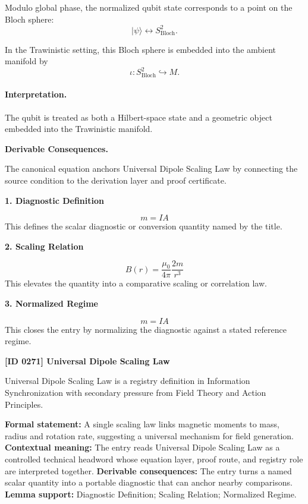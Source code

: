Modulo global phase, the normalized qubit state corresponds to a point on the Bloch sphere:
\begin{equation}
|\psi\rangle \longleftrightarrow S^2_{\mathrm{Bloch}} .
\end{equation}

In the Trawinistic setting, this Bloch sphere is embedded into the ambient manifold by
\begin{equation}
\boxed{
\iota:S^2_{\mathrm{Bloch}}\hookrightarrow M .
}
\end{equation}

\paragraph{Interpretation.}
The qubit is treated as both a Hilbert-space state and a geometric object embedded into the Trawinistic manifold.

\par\vspace{0.35em}
\noindent\textbf{Derivable Consequences.}\quad
\begingroup
\footnotesize
\raggedright
The canonical equation anchors Universal Dipole Scaling Law by connecting the source condition to the derivation layer and proof certificate.
\par\endgroup

\noindent\textbf{1. Diagnostic Definition}\par
\[
m=IA
\]
\noindent This defines the scalar diagnostic or conversion quantity named by the title.\par
\noindent\textbf{2. Scaling Relation}\par
\[
B(r)=\frac{\mu_0}{4\pi}\frac{2m}{r^3}
\]
\noindent This elevates the quantity into a comparative scaling or correlation law.\par
\noindent\textbf{3. Normalized Regime}\par
\[
m=IA
\]
\noindent This closes the entry by normalizing the diagnostic against a stated reference regime.\par

\clearpage
\noindent\textbf{[ID 0271] Universal Dipole Scaling Law}\par
\vspace{0.35em}
\begingroup\small
{}
Universal Dipole Scaling Law is a registry definition in Information Synchronization with secondary pressure from Field Theory and Action Principles.

\begingroup\footnotesize\setlength{\emergencystretch}{3em}\sloppy
\textbf{Formal statement:} A single scaling law links magnetic moments to mass, radius and rotation rate, suggesting a universal mechanism for field generation. \textbf{Contextual meaning:} The entry reads Universal Dipole Scaling Law as a controlled technical headword whose equation layer, proof route, and registry role are interpreted together. \textbf{Derivable consequences:} The entry turns a named scalar quantity into a portable diagnostic that can anchor nearby comparisons. \textbf{Lemma support:} Diagnostic Definition; Scaling Relation; Normalized Regime.\par
\endgroup


